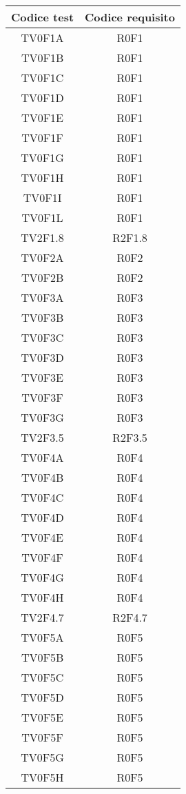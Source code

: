\begin{longtable}{|c|c|}
	\hline
	\textbf{Codice test} & \textbf{Codice requisito} \\
	\hline
	\endhead
	TV0F1A & R0F1\\
	\hline
	TV0F1B & R0F1\\
	\hline
	TV0F1C & R0F1\\
	\hline
	TV0F1D & R0F1\\
	\hline
	TV0F1E & R0F1\\
	\hline
	TV0F1F & R0F1\\
	\hline
	TV0F1G & R0F1\\
	\hline
	TV0F1H & R0F1\\
	\hline
	TV0F1I & R0F1\\
	\hline
	TV0F1L & R0F1\\
	\hline
	TV2F1.8 & R2F1.8\\
	\hline
	TV0F2A & R0F2\\
	\hline
	TV0F2B & R0F2\\
	\hline
	TV0F3A & R0F3\\
	\hline
	TV0F3B & R0F3\\
	\hline
	TV0F3C & R0F3\\
	\hline
	TV0F3D & R0F3\\
	\hline
	TV0F3E & R0F3\\
	\hline
	TV0F3F & R0F3\\
	\hline
	TV0F3G & R0F3\\
	\hline
	TV2F3.5 & R2F3.5\\
	\hline
	TV0F4A & R0F4\\
	\hline
	TV0F4B & R0F4\\
	\hline
	TV0F4C & R0F4\\
	\hline
	TV0F4D & R0F4\\
	\hline
	TV0F4E & R0F4\\
	\hline
	TV0F4F & R0F4\\
	\hline
	TV0F4G & R0F4\\
	\hline
	TV0F4H & R0F4\\
	\hline
	TV2F4.7 & R2F4.7\\
	\hline
	TV0F5A & R0F5\\
	\hline
	TV0F5B & R0F5\\
	\hline
	TV0F5C & R0F5\\
	\hline
	TV0F5D & R0F5\\
	\hline
	TV0F5E & R0F5\\
	\hline
	TV0F5F & R0F5\\
	\hline
	TV0F5G & R0F5\\
	\hline
	TV0F5H & R0F5\\

\end{longtable}
